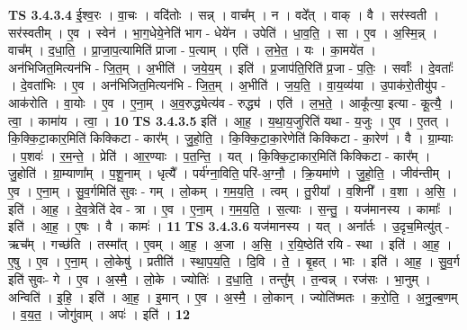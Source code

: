 \documentclass[17pt]{extarticle}
\begin{document}
                  \newline
                                \textbf{ TS 3.4.3.4} \newline
                  ई॒श्व॒रः । वा॒चः । वदि॑तोः । सन्न् । वाच᳚म् । न । वदे᳚त् । वाक् । वै । सर॑स्वती । सर॑स्वतीम् । ए॒व । स्वेन॑ । भा॒ग॒धेये॒नेति॑ भाग - धेये॑न । उपेति॑ । धा॒व॒ति॒ । सा । ए॒व । अ॒स्मि॒न्न् । वाच᳚म् । द॒धा॒ति॒ । प्रा॒जा॒प॒त्यामिति॑ प्राजा - प॒त्याम् । एति॑ । ल॒भे॒त॒ । यः । का॒मये॑त । अन॑भिजित॒मित्यन॑भि - जि॒त॒म् । अ॒भीति॑ । ज॒ये॒य॒म् । इति॑ । प्र॒जाप॑ति॒रिति॑ प्र॒जा - प॒तिः॒ । सर्वाः᳚ । दे॒वताः᳚ । दे॒वता॑भिः । ए॒व । अन॑भिजित॒मित्यन॑भि - जि॒त॒म् । अ॒भीति॑ । ज॒य॒ति॒ । वा॒य॒व्य॑या । उ॒पाक॑रो॒तीयु॑प - आक॑रोति । वा॒योः । ए॒व । ए॒ना॒म् । अ॒व॒रुद्ध्येत्य॑व - रुद्ध्य॑ । एति॑ । ल॒भ॒ते॒ । आकू᳚त्या॒ इत्या - कू॒त्यै॒ । त्वा॒ । कामा॑य । त्वा॒ । \textbf{  10} \newline
                  \newline
                                \textbf{ TS 3.4.3.5} \newline
                  इति॑ । आ॒ह॒ । य॒था॒य॒जुरिति॑ यथा - य॒जुः । ए॒व । ए॒तत् । कि॒क्कि॒टा॒कार॒मिति॑ किक्किटा - कार᳚म् । जु॒हो॒ति॒ । कि॒क्कि॒टा॒का॒रेणेति॑ किक्किटा - का॒रेण॑ । वै । ग्रा॒म्याः । प॒शवः॑ । र॒म॒न्ते॒ । प्रेति॑ । आ॒र॒ण्याः । प॒त॒न्ति॒ । यत् । कि॒क्कि॒टा॒कार॒मिति॑ किक्किटा - कार᳚म् । जु॒होति॑ । ग्रा॒म्याणा᳚म् । प॒शू॒नाम् । धृत्यै᳚ । पर्य॑ग्ना॒विति॒ परि॑-अ॒ग्नौ॒ । क्रि॒यमा॑णे । जु॒हो॒ति॒ । जीव॑न्तीम् । ए॒व । ए॒ना॒म् । सु॒व॒र्गमिति॑ सुवः - गम् । लो॒कम् । ग॒म॒य॒ति॒ । त्वम् । तु॒रीया᳚ । व॒शिनी᳚ । व॒शा । अ॒सि॒ । इति॑ । आ॒ह॒ । दे॒व॒त्रेति॑ देव - त्रा । ए॒व । ए॒ना॒म् । ग॒म॒य॒ति॒ । स॒त्याः । स॒न्तु॒ । यज॑मानस्य । कामाः᳚ । इति॑ । आ॒ह॒ । ए॒षः । वै । कामः॑ । \textbf{  11} \newline
                  \newline
                                \textbf{ TS 3.4.3.6} \newline
                  यज॑मानस्य । यत् । अना᳚र्तः । उ॒दृच॒मित्यु॑त् - ऋच᳚म् । गच्छ॑ति । तस्मा᳚त् । ए॒वम् । आ॒ह॒ । अ॒जा । अ॒सि॒ । र॒यि॒ष्ठेति॑ रयि - स्था । इति॑ । आ॒ह॒ । ए॒षु । ए॒व । ए॒ना॒म् । लो॒केषु॑ । प्रतीति॑ । स्था॒प॒य॒ति॒ । दि॒वि । ते॒ । बृ॒हत् । भाः । इति॑ । आ॒ह॒ । सु॒व॒र्ग इति॑ सुवः- गे । ए॒व । अ॒स्मै॒ । लो॒के । ज्योतिः॑ । द॒धा॒ति॒ । तन्तु᳚म् । त॒न्वन्न् । रज॑सः । भा॒नुम् । अन्विति॑ । इ॒हि॒ । इति॑ । आ॒ह॒ । इ॒मान् । ए॒व । अ॒स्मै॒ । लो॒कान् । ज्योति॑ष्मतः । क॒रो॒ति॒ । अ॒नु॒ल्ब॒णम् । व॒य॒त॒ । जोगु॑वाम् । अपः॑ । इति॑ । \textbf{  12} \newline
                  \newline
\end{document}
